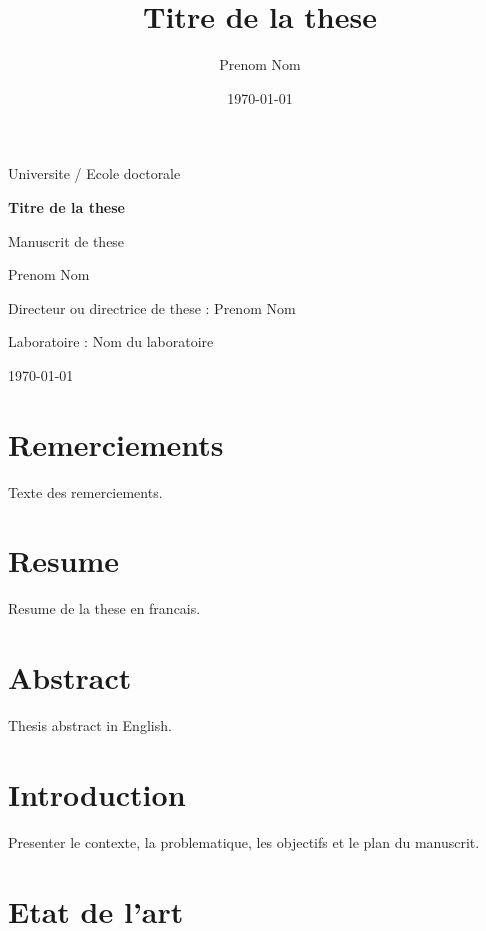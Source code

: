 \documentclass[11pt,a4paper,oneside]{book}
\title{Titre de la these}
\author{Prenom Nom}
\date{\today}
\begin{document}
\frontmatter


\begin{titlepage}
  \centering
  {\Large Universite / Ecole doctorale\par}
  \vspace{2cm}
  {\Huge\bfseries Titre de la these\par}
  \vspace{1cm}
  {\Large Manuscrit de these\par}
  \vspace{2cm}
  {\Large Prenom Nom\par}
  \vfill
  Directeur ou directrice de these : Prenom Nom\par
  Laboratoire : Nom du laboratoire\par
  \vspace{1cm}
  {\large \today\par}
\end{titlepage}

\cleardoublepage
{}

\chapter*{Remerciements}

Texte des remerciements.

\chapter*{Resume}

Resume de la these en francais.

\chapter*{Abstract}

Thesis abstract in English.

\tableofcontents

\mainmatter

\chapter{Introduction}

Presenter le contexte, la problematique, les objectifs et le plan du manuscrit.

\chapter{Etat de l'art}
\end{document}
